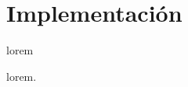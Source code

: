 \section{Implementación}

\begin{frame}{lorem}
    \begin{block}{lorem.}

    \end{block}


\end{frame}
